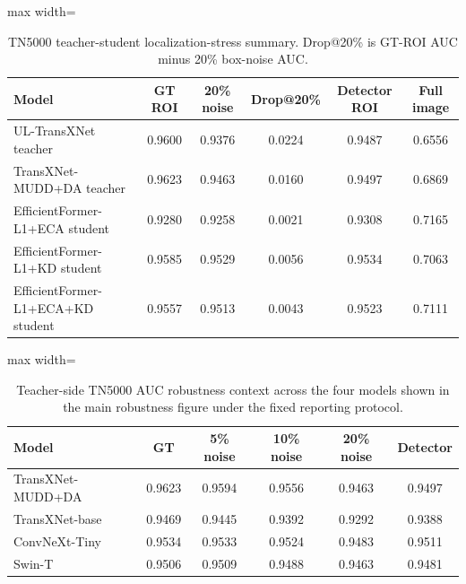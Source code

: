 \documentclass[preprint,12pt]{elsarticle}
\begin{document}
\begin{table}[H]
    \centering
    \small
    \caption{TN5000 teacher-student localization-stress summary. Drop@20\% is GT-ROI AUC minus 20\% box-noise AUC.}
    \label{tab:s_teacher_student_robustness}
    \begin{adjustbox}{max width=\columnwidth}
    \begin{tabular}{lccccc}
        \toprule
        Model & GT ROI & 20\% noise & Drop@20\% & Detector ROI & Full image \\
        \midrule
        UL-TransXNet teacher & 0.9600 & 0.9376 & 0.0224 & 0.9487 & 0.6556 \\
        TransXNet-MUDD+DA teacher & 0.9623 & 0.9463 & 0.0160 & 0.9497 & 0.6869 \\
        EfficientFormer-L1+ECA student & 0.9280 & 0.9258 & 0.0021 & 0.9308 & 0.7165 \\
        EfficientFormer-L1+KD student & 0.9585 & 0.9529 & 0.0056 & 0.9534 & 0.7063 \\
        EfficientFormer-L1+ECA+KD student & 0.9557 & 0.9513 & 0.0043 & 0.9523 & 0.7111 \\
        \bottomrule
    \end{tabular}
    \end{adjustbox}
\end{table}

\begin{table}[H]
    \centering
    \small
    \caption{Teacher-side TN5000 AUC robustness context across the four models shown in the main robustness figure under the fixed reporting protocol.}
    \label{tab:s_roi_robustness}
    \begin{adjustbox}{max width=\columnwidth}
    \begin{tabular}{lccccc}
        \toprule
        Model & GT & 5\% noise & 10\% noise & 20\% noise & Detector \\
        \midrule
        TransXNet-MUDD+DA & 0.9623 & 0.9594 & 0.9556 & 0.9463 & 0.9497 \\
        TransXNet-base & 0.9469 & 0.9445 & 0.9392 & 0.9292 & 0.9388 \\
        ConvNeXt-Tiny & 0.9534 & 0.9533 & 0.9524 & 0.9483 & 0.9511 \\
        Swin-T & 0.9506 & 0.9509 & 0.9488 & 0.9463 & 0.9481 \\
        \bottomrule
    \end{tabular}
    \end{adjustbox}
\end{table}
\end{document}

